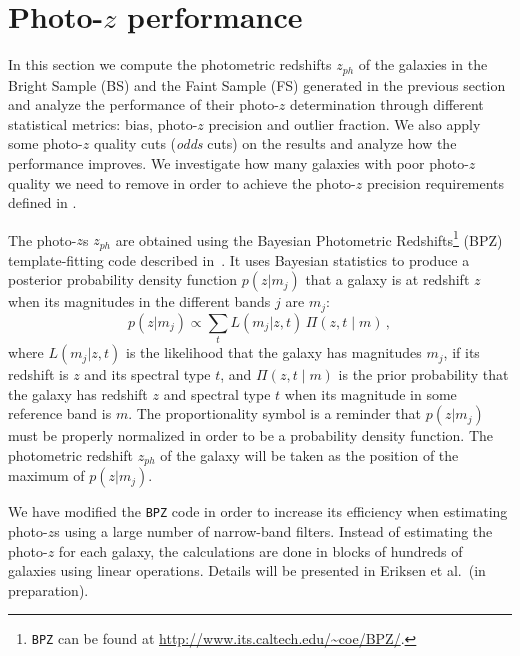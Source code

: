 \section{Photo-$z$ performance}
\label{sec:photoz}

In this section we compute the photometric redshifts $z_{ph}$ of the galaxies in the Bright Sample (BS) and the Faint Sample (FS) generated in the previous section and analyze the performance of their photo-$z$ determination through different statistical metrics: bias, photo-$z$ precision and outlier fraction. We also apply some photo-$z$ quality cuts (\textit{odds} cuts) on the results and analyze how the performance improves. We investigate how many galaxies with poor photo-$z$ quality we need to remove in order to achieve the photo-$z$ precision requirements defined in \citet{Gaztanaga2012}.

The photo-$z$s $z_{ph}$ are obtained using the Bayesian Photometric Redshifts\footnote{\texttt{BPZ} can be found at \url{http://www.its.caltech.edu/~coe/BPZ/}.} (BPZ) template-fitting code described in~\citet{Benitez2000}. It uses Bayesian statistics to produce a posterior probability density function $p(z|m_j)$ that a galaxy is at redshift $z$ when its magnitudes in the different bands $j$ are $m_j$:
\begin{equation}
p(z|m_j) \propto \sum_t L(m_j|z,t) \, \Pi(z,t \mid m)  \, ,
\label{pz}
\end{equation}
where $L(m_j|z,t)$ is the likelihood that the galaxy has magnitudes $m_j$, if its redshift is $z$ and its spectral type $t$, and $\Pi(z,t \mid m)$ is the prior probability that the galaxy has redshift $z$ and spectral type $t$ when its magnitude in some reference band is $m$. The proportionality symbol is a reminder that $p(z|m_j)$ must be properly normalized in order to be a probability density function. The photometric redshift $z_{ph}$ of the galaxy will be taken as the position of the maximum of $p(z|m_j)$.

We have modified the {\tt BPZ} code in order to increase its efficiency when estimating photo-$z$s using a large number of narrow-band filters. Instead of estimating the
photo-$z$ for each galaxy, the calculations are done in blocks
of hundreds of galaxies using linear operations. Details will
be presented in Eriksen et al.~(in preparation).

